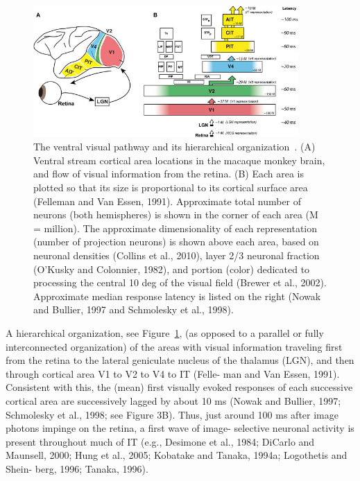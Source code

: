 \begin{figure}
	\centering
	\includegraphics[width=0.9\textwidth]{pics/ventral.jpg}
	\caption{The ventral visual pathway and its hierarchical organization~\cite{dicarlo2012does}.
	(A) Ventral stream cortical area locations in the macaque monkey brain, and flow of visual information from the retina.
	(B) Each area is plotted so that its size is proportional to its cortical surface area (Felleman and Van Essen, 1991). Approximate total number of neurons (both hemispheres) is shown in the corner of each area (M = million). The approximate dimensionality of each representation (number of projection neurons) is shown above each area, based on neuronal densities (Collins et al., 2010), layer 2/3 neuronal fraction (O'Kusky and Colonnier, 1982), and portion (color) dedicated to processing the central 10 deg of the visual field (Brewer et al., 2002). Approximate median response latency is listed on the right (Nowak and Bullier, 1997 and Schmolesky et al., 1998).}
	\label{Fig:Ventral}
\end{figure}
A hierarchical organization, see Figure~\ref{Fig:Ventral}, (as opposed to a parallel or fully interconnected
organization) of the areas with visual information traveling first
from the retina to the lateral geniculate nucleus of the thalamus
(LGN), and then through cortical area V1 to V2 to V4 to IT (Felle-
man and Van Essen, 1991). Consistent with this, the (mean) first
visually evoked responses of each successive cortical area are
successively lagged by about 10 ms (Nowak and Bullier, 1997;
Schmolesky et al., 1998; see Figure 3B). Thus, just around 100 ms after
image photons impinge on the retina, a first wave of image-
selective neuronal activity is present throughout much of IT
(e.g., Desimone et al., 1984; DiCarlo and Maunsell, 2000; Hung
et al., 2005; Kobatake and Tanaka, 1994a; Logothetis and Shein-
berg, 1996; Tanaka, 1996).

